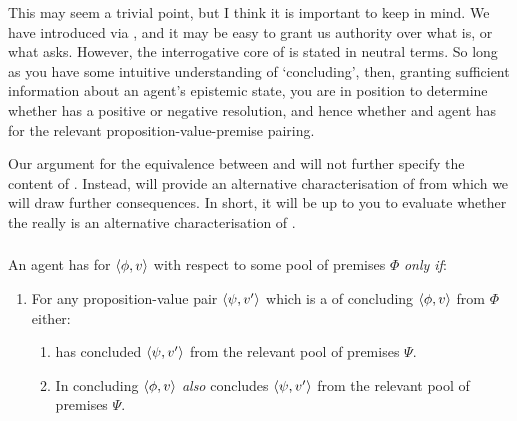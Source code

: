 \begin{note}[Intuition]
  This may seem a trivial point, but I think it is important to keep in mind.
  We have introduced \zs{} via \qzs{}, and it may be easy to grant us authority over what \zs{} is, or what \qzs{} asks.
  However, the interrogative core of \qzs{} is stated in neutral terms.
  So long as you have some intuitive understanding of `concluding', then, granting sufficient information about an agent's epistemic state, you are in position to determine whether \qzs{} has a positive or negative resolution, and hence whether and agent has \zs{} for the relevant proposition-value-premise pairing.

  Our argument for the equivalence between \zs{} and \Zs{} will not further specify the content of \qzs{}.
  Instead, \Zs{} will provide an alternative characterisation of \zs{} from which we will draw further consequences.
  In short, it will be up to you to evaluate whether the \Zs{} really is an alternative characterisation of \zs{}.
\end{note}

\subsubsection{\Zs{-}}

\begin{note}
  \begin{idea}[\iZs{-} --- \iZs{}]
    \label{idea:Zs:overview}
    An agent \vAgent{} has \emph{\Zs{-}} for \(\langle \phi, v \rangle\) with respect to some pool of premises \(\Phi\) \emph{only if}:
    \begin{enumerate}[label=\arabic*., ref=\named{CS:\arabic*}]
    \item
      \label{idea:Zs:overview:requ}
      For any proposition-value pair \(\langle \psi, v' \rangle\) which is a \requ{} of concluding \(\langle \phi, v \rangle\) from \(\Phi\) either:
      \begin{enumerate}[label=\alph*., ref=\named{CS:1.\alph*}]
      \item
        \label{idea:Zs:overview:requ-sat:Past}
        \vAgent{} has concluded \(\langle \psi, v' \rangle\) from the relevant pool of premises \(\Psi\).
      \item
        \label{idea:Zs:overview:requ-sat:Pres}
        In concluding \(\langle \phi, v \rangle\) \vAgent{} \emph{also} concludes \(\langle \psi, v' \rangle\) from the relevant pool of premises \(\Psi\).
      \end{enumerate}
    \end{enumerate}
    \vspace{-\baselineskip}
  \end{idea}
\end{note}

